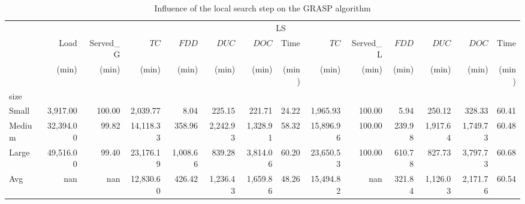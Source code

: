 \documentclass{article}
\begin{document}
\begin{table}[htb]
    \centering
    \caption{Influence of the local search step on the GRASP algorithm}
    \label{tab:grasp_ls_nols}
    \begin{tabular}{lrrrrrrrrrrrrr}
        \toprule
               & \multicolumn{13}{c}{LS}                                                                                                                               \\
               & Load                    & Served_G & $TC$      & $FDD$    & $DUC$    & $DOC$    & Time  & $TC$      & Served_L & $FDD$  & $DUC$    & $DOC$    & Time  \\
               & (min)                   & (min)    & (min)     & (min)    & (min)    & (min)    & (min) & (min)     & (min)    & (min)  & (min)    & (min)    & (min) \\
        size   &                         &          &           &          &          &          &       &           &          &        &          &          &       \\
        \midrule
        Small  & 3,917.00                & 100.00   & 2,039.77  & 8.04     & 225.15   & 221.71   & 24.22 & 1,965.93  & 100.00   & 5.94   & 250.12   & 328.33   & 60.41 \\
        Medium & 32,394.00               & 99.82    & 14,118.33 & 358.96   & 2,242.93 & 1,328.91 & 58.32 & 15,896.96 & 100.00   & 239.98 & 1,917.64 & 1,749.73 & 60.48 \\
        Large  & 49,516.00               & 99.40    & 23,176.19 & 1,008.66 & 839.28   & 3,814.06 & 60.20 & 23,650.53 & 100.00   & 610.78 & 827.73   & 3,797.73 & 60.68 \\
        Avg    & nan                     & nan      & 12,830.60 & 426.42   & 1,236.43 & 1,659.86 & 48.26 & 15,494.82 & nan      & 321.84 & 1,126.03 & 2,171.76 & 60.54 \\
        \bottomrule
    \end{tabular}
\end{table}
\end{document}
